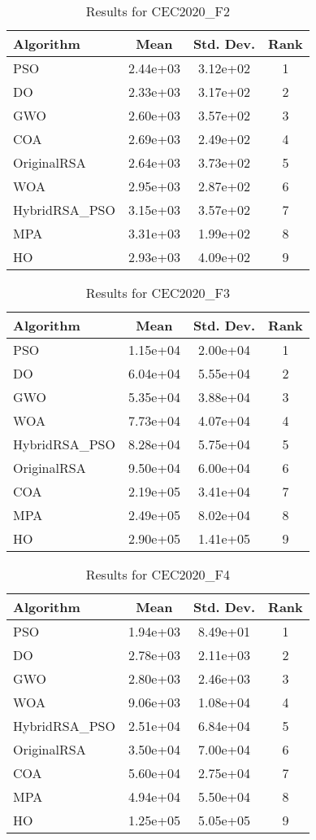 \documentclass[12pt]{article}
\begin{document}
\begin{table}[H]
\centering
\caption{Results for CEC2020\_F2}
\begin{tabular}{|l|c|c|c|}
\hline
\textbf{Algorithm} & \textbf{Mean} & \textbf{Std. Dev.} & \textbf{Rank} \\
\hline
PSO & 2.44e+03 & 3.12e+02 & 1 \\
DO & 2.33e+03 & 3.17e+02 & 2 \\
GWO & 2.60e+03 & 3.57e+02 & 3 \\
COA & 2.69e+03 & 2.49e+02 & 4 \\
OriginalRSA & 2.64e+03 & 3.73e+02 & 5 \\
WOA & 2.95e+03 & 2.87e+02 & 6 \\
HybridRSA\_PSO & 3.15e+03 & 3.57e+02 & 7 \\
MPA & 3.31e+03 & 1.99e+02 & 8 \\
HO & 2.93e+03 & 4.09e+02 & 9 \\
\hline
\end{tabular}
\end{table}

\begin{table}[H]
\centering
\caption{Results for CEC2020\_F3}
\begin{tabular}{|l|c|c|c|}
\hline
\textbf{Algorithm} & \textbf{Mean} & \textbf{Std. Dev.} & \textbf{Rank} \\
\hline
PSO & 1.15e+04 & 2.00e+04 & 1 \\
DO & 6.04e+04 & 5.55e+04 & 2 \\
GWO & 5.35e+04 & 3.88e+04 & 3 \\
WOA & 7.73e+04 & 4.07e+04 & 4 \\
HybridRSA\_PSO & 8.28e+04 & 5.75e+04 & 5 \\
OriginalRSA & 9.50e+04 & 6.00e+04 & 6 \\
COA & 2.19e+05 & 3.41e+04 & 7 \\
MPA & 2.49e+05 & 8.02e+04 & 8 \\
HO & 2.90e+05 & 1.41e+05 & 9 \\
\hline
\end{tabular}
\end{table}

\begin{table}[H]
\centering
\caption{Results for CEC2020\_F4}
\begin{tabular}{|l|c|c|c|}
\hline
\textbf{Algorithm} & \textbf{Mean} & \textbf{Std. Dev.} & \textbf{Rank} \\
\hline
PSO & 1.94e+03 & 8.49e+01 & 1 \\
DO & 2.78e+03 & 2.11e+03 & 2 \\
GWO & 2.80e+03 & 2.46e+03 & 3 \\
WOA & 9.06e+03 & 1.08e+04 & 4 \\
HybridRSA\_PSO & 2.51e+04 & 6.84e+04 & 5 \\
OriginalRSA & 3.50e+04 & 7.00e+04 & 6 \\
COA & 5.60e+04 & 2.75e+04 & 7 \\
MPA & 4.94e+04 & 5.50e+04 & 8 \\
HO & 1.25e+05 & 5.05e+05 & 9 \\
\hline
\end{tabular}
\end{table}
\end{document}

